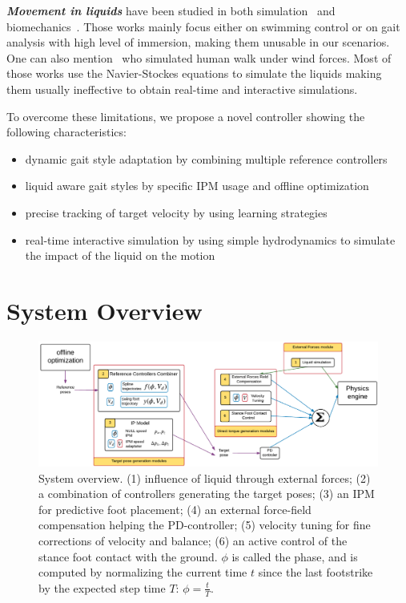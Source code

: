 \documentclass[runningheads,a4paper,10pt]{llncs}
\begin{document}
\textbf{\textit{Movement in liquids}} have been studied in both simulation~\citep{yang2004layered,si2014realistic} and biomechanics~\citep{barela2006biomechanical,chevutschi2009comparison}. Those works mainly focus either on swimming control or on gait analysis with high level of immersion, making them unusable in our scenarios.
One can also mention~\citep{lentine2011creature} who simulated human walk under wind forces. Most of those works use the Navier-Stockes equations to simulate the liquids making them usually ineffective to obtain real-time and interactive simulations.

To overcome these limitations, we propose a novel controller showing the following characteristics:
\begin{itemize}[noitemsep,nolistsep]
\item{dynamic gait style adaptation by combining multiple reference controllers}
\item{liquid aware gait styles by specific IPM usage and offline optimization}
\item{precise tracking of target velocity by using learning strategies}
\item{real-time interactive simulation by using simple hydrodynamics to simulate the impact of the liquid on the motion}
\end{itemize}

\section{System Overview}
\label{sec:overview}

\begin{figure}[t]
\centering
\includegraphics[scale=0.55]{images/general_process.pdf}
\caption{System overview. (1) influence of liquid through external forces; (2) a combination of controllers generating the target poses; (3) an IPM for predictive foot placement; (4) an external force-field compensation helping the PD-controller; (5) velocity tuning for fine corrections of velocity and balance; (6) an active control of the stance foot contact with the ground. $\phi$ is called the phase, and is computed by normalizing the current time $t$ since the last footstrike by the expected step time $T$: $\phi=\frac{t}{T}$.}
\label{fig:shema_controler}
\end{figure}
\end{document}
